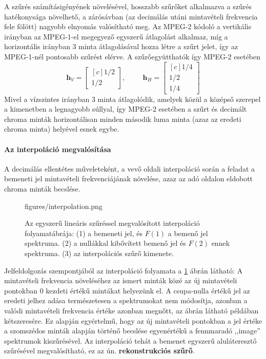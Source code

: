 A szűrés számításigényének növelésével, hosszabb szűrőket alkalmazva a szűrés hatékonysága növelhető, a zárósávban (az decimálás utáni mintavételi frekvencia fele fölött) nagyobb elnyomás valósítható meg.
Az MPEG-2 kódoló a vertikális irányban az MPEG-1-el megegyező egyszerű átlagolást alkalmaz, míg a horizontális irányban 3 minta átlagolásával hozza létre a szűrt jelet, így az MPEG-1-nél pontosabb szűrést elérve.
A szűrőegyütthatók így MPEG-2 esetében
\begin{equation}
\mathbf{h}_V =
\begin{bmatrix}[c]
       1/2 \\[0.3em]
       1/2\end{bmatrix}
,
\hspace{1cm}
\mathbf{h}_H =
\begin{bmatrix}[c]
       1/4 \\[0.3em]
       1/2 \\[0.3em]
       1/4\end{bmatrix}
\end{equation}
Mivel a vízszintes irányban 3 minta átlagolódik, amelyek közül a középső szerepel a kimenetben a legnagyobb súllyal, így MPEG-2 esetében a szűrt és decimált chroma minták horizontálisan minden második luma minta (azaz az eredeti chroma minta) helyével esnek egybe.

\paragraph{Az interpoláció megvalósítása}
A decimálás ellentétes műveleteként, a vevő oldali interpoláció során a feladat a bemeneti jel mintavételi frekvenciájának növelése, azaz az adó oldalon eldobott chroma minták becslése.
\begin{figure}[]
	\centering
	\begin{overpic}[width = 0.8\columnwidth]{figures/interpolation.png}
 	\end{overpic}
	\caption{Az egyszerű lineáris szűréssel megvalósított interpoláció folyamatábrája:
	(1) a bemeneti jel, és $F(1)$ a bemenő jel spektruma.
	(2) a nullákkal kibővített bemenő jel és $F(2)$ ennek spektruma.
	(3) az interpolációs szűrő kimenete.}
	\label{Fig:interpolation}
\end{figure}
Jelfeldolgozás szempontjából az interpoláció folyamata a \ref{Fig:interpolation} ábrán látható:
A mintavételi frekvencia növeléséhez az ismert minták közé az új mintavételi pontokban 0 kezdeti értékű mintákat helyezünk el.
A csupa-nulla értékű jel az eredeti jelhez adása természetesen a spektrumokat nem módosítja, azonban a valódi mintavételi frekvencia értéke azonban megnőtt, az ábrán látható példában kétszeresére.
Ez alapján egyértelmű, hogy az új mintavételi pontokban a jel értéke a szomszédos minták alapján történő becslése egyenértékű a fennmaradó ,,image'' spektrumok kiszűrésével.
Az interpoláció tehát a bemenet egyszerű aluláteresztő szűrésével megvalósítható, ez az ún. \textbf{rekonstrukciós szűrő}.


